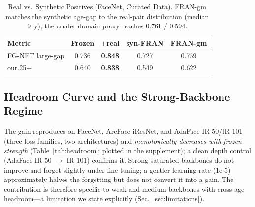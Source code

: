\documentclass[journal]{IEEEtran}
\begin{document}
\begin{table}[!t]
\renewcommand{\arraystretch}{1.15}
\caption{Real vs.\ Synthetic Positives (FaceNet, Curated Data). FRAN-gm matches the synthetic age-gap to the real-pair distribution (median 9~y); the cruder domain proxy reaches 0.761 / 0.594.}
\label{tab:synth}
\centering
\footnotesize
\begin{tabular}{@{}lcccc@{}}
\toprule
Metric & Frozen & $+$real & syn-FRAN & FRAN-gm \\
\midrule
FG-NET large-gap & 0.736 & \textbf{0.848} & 0.727 & 0.759 \\
our.25+ & 0.640 & \textbf{0.838} & 0.549 & 0.622 \\
\bottomrule
\end{tabular}
\end{table}

\subsection{Headroom Curve and the Strong-Backbone Regime}\label{sec:res-headroom}
The gain reproduces on FaceNet, ArcFace iResNet, and AdaFace IR-50/IR-101 (three loss families, two architectures) and \emph{monotonically decreases with frozen strength} (Table~\ref{tab:headroom}; plotted in the supplement); a clean depth control (AdaFace IR-50 $\rightarrow$ IR-101) confirms it. Strong saturated backbones do not improve and forget slightly under fine-tuning; a gentler learning rate (1e-5) approximately halves the forgetting but does not convert it into a gain. The contribution is therefore specific to weak and medium backbones with cross-age headroom---a limitation we state explicitly (Sec.~\ref{sec:limitations}).
\end{document}
